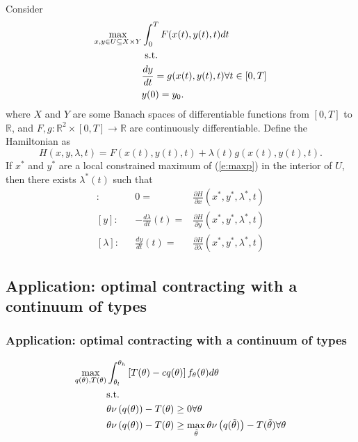 \documentclass[compress]{beamer}
\def\R{\mathbb{R}}
\renewcommand{\to}{{\rightarrow}}
\begin{document}
\begin{frame}
  \begin{theorem}\label{thm:optcon}
    Consider 
    \begin{align}
      \max_{x,y \in U \subseteq X \times Y} & \int_0^T F(x(t),y(t),t) dt \notag \\
      & \text{ s.t.} \\
      &  \frac{d y}{dt} = g(x(t),y(t),t) \forall t \in
      [0,T] \label{e:maxp} \\ 
      & y(0) = y_0. \notag
    \end{align}
    where $X$ and $Y$ are some Banach spaces of differentiable 
    functions from $[0,T]$ to $\R$, and $F,g:\R^2 \times [0,T] \to \R$ are
    continuously differentiable. Define the Hamiltonian as 
    \[ H(x,y,\lambda,t) = F(x(t),y(t),t) + \lambda(t) g(x(t),y(t),t). \]
    If $x^*$ and $y^*$ are a local constrained maximum of
    (\ref{e:maxp}) in the interior of $U$, then there exists
    $\lambda^*(t)$ such that 
    \begin{align*}
      [x]: && 0 = & \frac{\partial H}{\partial x}(x^*,y^*,\lambda^*,t)
      \\
      [y]: && -\frac{d\lambda}{dt}(t) = & \frac{\partial H}{\partial y}(x^*,y^*,\lambda^*,t) \\
      [\lambda]: && \frac{dy}{dt}(t) = & \frac{\partial H}{\partial
        \lambda}(x^*,y^*,\lambda^*,t)
    \end{align*}
  \end{theorem}
\end{frame}

\subsection{Application: optimal contracting with a continuum of
  types} 

\begin{frame}\frametitle{Application: optimal contracting with a continuum of
    types}
  \begin{align}
    \max_{q(\theta),T(\theta)} & \int_{\theta_l}^{\theta_h} 
    \left[T(\theta) - cq(\theta)\right]
    f_\theta(\theta) d\theta \notag \\
    & \text{s.t.} \notag \\
    &\theta \nu\left(q(\theta)\right) - T(\theta) \geq 0  \forall
    \theta \label{pc2} \\
    &\theta \nu\left(q(\theta)\right) - T(\theta) \geq
    \max_{\tilde{\theta}} \theta \nu\left(q(\tilde{\theta}) \right) -
    T(\tilde{\theta}) \forall \theta \label{ic2} 
  \end{align}
\end{frame}
\end{document}
